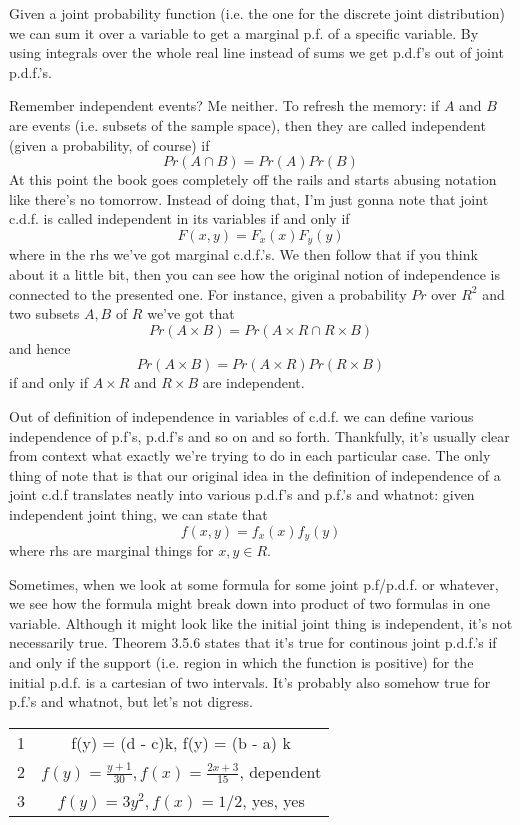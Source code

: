 \documentclass[11pt,oneside,titlepage]{book}
\begin{document}
Given a joint probability function (i.e. the one for the discrete
joint distribution) we can sum it over a variable to get a marginal
p.f. of a specific variable. By using integrals over the whole real
line instead of sums we get p.d.f's out of joint p.d.f.'s.

Remember independent events? Me neither. To refresh the memory: if $A$
and $B$ are events (i.e. subsets of the sample space), then they are
called independent (given a probability, of course) if
$$Pr(A \cap B) = Pr(A) Pr(B)$$
At this point the book goes completely off the rails and starts
abusing notation like there's no tomorrow. Instead of doing that, I'm
just gonna note that joint c.d.f. is called independent in its variables if and only if 
$$F(x, y) = F_x(x) F_y(y)$$
where in the rhs we've got marginal c.d.f.'s. We then follow that if
you think about it a little bit, then you can see how the original
notion of independence is connected to the presented one. For instance,
given a probability $Pr$ over $R^2$ and two subsets $A, B$ of $R$ we've got that 
$$Pr(A \times B) = Pr(A \times R \cap R \times B)$$
and hence
$$Pr(A \times B) = Pr(A \times R) Pr(R \times B)$$
if and only if $A \times R$ and $R \times B$ are independent.

Out of definition of independence in variables of c.d.f. we can define
various independence of p.f's, p.d.f's and so on and so
forth. Thankfully, it's usually clear from context what exactly we're
trying to do in each particular case. The only thing of note that is
that our original idea in the definition of independence of a joint c.d.f
translates neatly into various p.d.f's and p.f.'s and whatnot:
given independent joint thing, we can state that 
$$f(x, y) = f_x(x) f_y(y)$$
where rhs are marginal things for $x, y \in R$.

Sometimes, when we look at some formula for some joint p.f/p.d.f. or
whatever, we see how the formula might break down into product of two
formulas in one variable. Although it might look like the initial
joint thing is independent, it's not necessarily true. Theorem 3.5.6
states that it's true for continous joint p.d.f.'s if and only if the
support (i.e. region in which the function is positive) for the
initial p.d.f. is a cartesian of two intervals. It's probably also
somehow true for p.f.'s and whatnot, but let's not digress.


\begin{tabular}[center]{||c | c|| }
  \hline
  1 & f(y) = (d - c)k, f(y) = (b - a) k \\
  2 & $f(y) = \frac{y + 1}{30}, f(x) = \frac{2x + 3}{15}$, dependent \\
  3 & $f(y) = 3 y^2, f(x) = 1/2$, yes, yes \\
  \hline 
\end{tabular}
\end{document}
